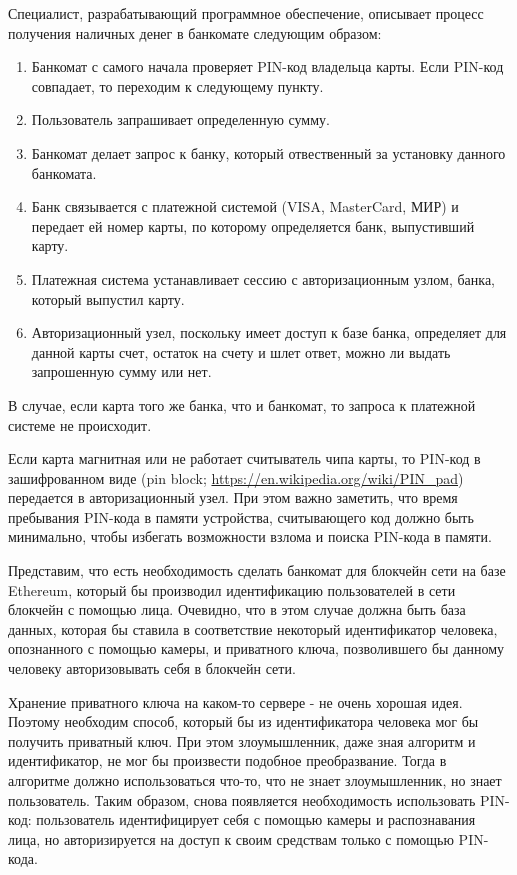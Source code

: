 
Специалист, разрабатывающий программное обеспечение, описывает процесс получения наличных денег в банкомате следующим образом:

\begin{enumerate}
    \item Банкомат с самого начала проверяет PIN-код владельца карты. Если PIN-код совпадает, то переходим к следующему пункту.
    \item Пользователь запрашивает определенную сумму.
    \item Банкомат делает запрос к банку, который отвественный за установку данного банкомата.
    \item Банк связывается с платежной системой (VISA, MasterCard, МИР) и передает ей номер карты, по которому определяется банк, выпустивший карту.
    \item Платежная система устанавливает сессию с авторизационным узлом, банка, который выпустил карту.
    \item Авторизационный узел, поскольку имеет доступ к базе банка, определяет для данной карты счет, остаток на счету и шлет ответ, можно ли выдать запрошенную сумму или нет.
\end{enumerate}

В случае, если карта того же банка, что и банкомат, то запроса к платежной системе не происходит.

Если карта магнитная или не работает считыватель чипа карты, то PIN-код в зашифрованном виде (pin block; \url{https://en.wikipedia.org/wiki/PIN_pad}) передается в авторизационный узел. При этом важно заметить, что время пребывания PIN-кода в памяти устройства, считывающего код должно быть минимально, чтобы избегать возможности взлома и поиска PIN-кода в памяти.

Представим, что есть необходимость сделать банкомат для блокчейн сети на базе Ethereum, который бы производил идентификацию пользователей в сети блокчейн с помощью лица. Очевидно, что в этом случае должна быть база данных, которая бы ставила в соответствие некоторый идентификатор человека, опознанного с помощью камеры, и приватного ключа, позволившего бы данному человеку авторизовывать себя в блокчейн сети.

Хранение приватного ключа на каком-то сервере - не очень хорошая идея. Поэтому необходим способ, который бы из идентификатора человека мог бы получить приватный ключ. При этом злоумышленник, даже зная алгоритм и идентификатор, не мог бы произвести подобное преобразвание. Тогда в алгоритме должно использоваться что-то, что не знает злоумышленник, но знает пользователь. Таким образом, снова появляется необходимость использовать PIN-код: пользователь идентифицирует себя с помощью камеры и распознавания лица, но авторизируется на доступ к своим средствам только с помощью PIN-кода.

